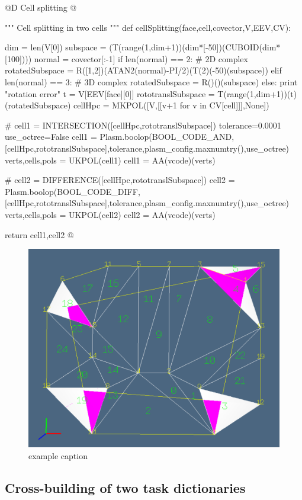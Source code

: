 \documentclass[11pt,oneside]{article}	%
\begin{document}
@D Cell splitting
@{""" Cell splitting in two cells """
def cellSplitting(face,cell,covector,V,EEV,CV):

	dim = len(V[0])
	subspace = (T(range(1,dim+1))(dim*[-50])(CUBOID(dim*[100])))
	normal = covector[:-1]
	if len(normal) == 2:  # 2D complex
		rotatedSubspace = R([1,2])(ATAN2(normal)-PI/2)(T(2)(-50)(subspace))
	elif len(normal) == 3:  # 3D complex
		rotatedSubspace = R()()(subspace)
	else: print "rotation error"
	t = V[EEV[face][0]]
	rototranslSubspace = T(range(1,dim+1))(t)(rotatedSubspace)
	cellHpc = MKPOL([V,[[v+1 for v in CV[cell]]],None])
	
	# cell1 = INTERSECTION([cellHpc,rototranslSubspace])
	tolerance=0.0001
	use_octree=False
	cell1 = Plasm.boolop(BOOL_CODE_AND, 
		[cellHpc,rototranslSubspace],tolerance,plasm_config.maxnumtry(),use_octree)
	verts,cells,pols = UKPOL(cell1)
	cell1 = AA(vcode)(verts)

	# cell2 = DIFFERENCE([cellHpc,rototranslSubspace])	
	cell2 = Plasm.boolop(BOOL_CODE_DIFF, 
		[cellHpc,rototranslSubspace],tolerance,plasm_config.maxnumtry(),use_octree)
	verts,cells,pols = UKPOL(cell2)
	cell2 = AA(vcode)(verts)

	return cell1,cell2
@}

\begin{figure}[htbp] %
   \centering
   \includegraphics[width=0.6\linewidth]{images/seeds} 
   \caption{example caption}
   \label{fig:example}
\end{figure}


\subsection{Cross-building of two task dictionaries}
\end{document}
